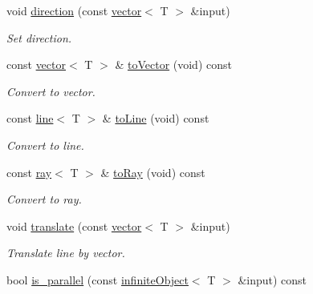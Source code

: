 \begin{DoxyCompactItemize}
void \hyperlink{classddd_1_1infinite_object_a1940ac3d87fc2ca742ca036c866736e8}{direction} (const \hyperlink{classddd_1_1vector}{vector}$<$ T $>$ \&input)
\begin{DoxyCompactList}\small\item\em Set direction. \end{DoxyCompactList}\item 
\mbox{\label{classddd_1_1infinite_object_a7f5790458f0f4e5bb085b580ead9e862}} 
const \hyperlink{classddd_1_1vector}{vector}$<$ T $>$ \& \hyperlink{classddd_1_1infinite_object_a7f5790458f0f4e5bb085b580ead9e862}{to\+Vector} (void) const
\begin{DoxyCompactList}\small\item\em Convert to vector. \end{DoxyCompactList}\item 
\mbox{\label{classddd_1_1infinite_object_ab51b563ee31f9b473cc2459f6fd6caae}} 
const \hyperlink{classddd_1_1line}{line}$<$ T $>$ \& \hyperlink{classddd_1_1infinite_object_ab51b563ee31f9b473cc2459f6fd6caae}{to\+Line} (void) const
\begin{DoxyCompactList}\small\item\em Convert to line. \end{DoxyCompactList}\item 
\mbox{\label{classddd_1_1infinite_object_ac34ea2bfd432c3a07c03b508c3e1e499}} 
const \hyperlink{classddd_1_1ray}{ray}$<$ T $>$ \& \hyperlink{classddd_1_1infinite_object_ac34ea2bfd432c3a07c03b508c3e1e499}{to\+Ray} (void) const
\begin{DoxyCompactList}\small\item\em Convert to ray. \end{DoxyCompactList}\item 
void \hyperlink{classddd_1_1infinite_object_a72649daa44060efdbef986ab9d90f3f6}{translate} (const \hyperlink{classddd_1_1vector}{vector}$<$ T $>$ \&input)
\begin{DoxyCompactList}\small\item\em Translate line by vector. \end{DoxyCompactList}\item 
bool \hyperlink{classddd_1_1infinite_object_a52c16b849e5bd987c69ed6ae79a6cab1}{is\+\_\+parallel} (const \hyperlink{classddd_1_1infinite_object}{infinite\+Object}$<$ T $>$ \&input) const

\end{DoxyCompactItemize}
